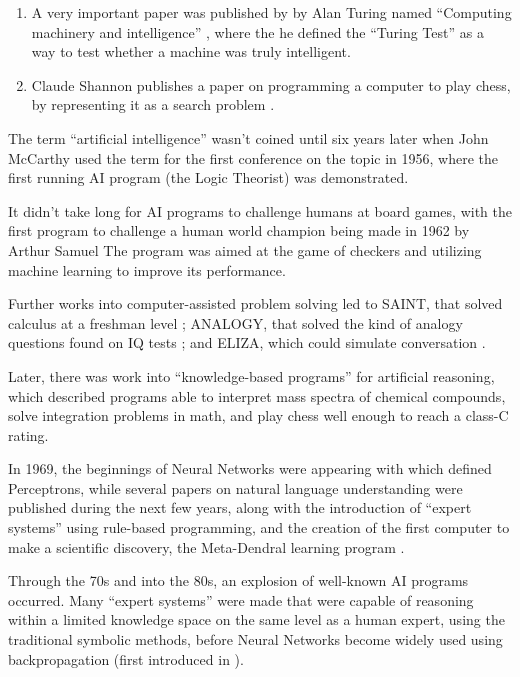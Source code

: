 \begin{enumerate}
\item A very important paper was published by by Alan Turing named ``Computing
  machinery and intelligence'' \citep{turing1950computing}, where the he defined
  the ``Turing Test'' as a way to test whether a machine was truly intelligent.
\item Claude Shannon publishes a paper on programming a computer to play chess,
  by representing it as a search problem \citep{shannon1950programming}.
\end{enumerate}

The term ``artificial intelligence'' wasn't coined until six years later when
John McCarthy used the term for the first conference on the topic in 1956, where
the first running AI program (the Logic Theorist) was demonstrated.

It didn't take long for AI programs to challenge humans at board games, with the
first program to challenge a human world champion being made in 1962 by Arthur
Samuel The program was aimed at the game of checkers and utilizing machine
learning to improve its performance.

Further works into computer-assisted problem solving led to SAINT, that solved
calculus at a freshman level \citep{slagle1963heuristic}; ANALOGY, that solved
the kind of analogy questions found on IQ tests \citet{evans1964program}; and
ELIZA, which could simulate conversation \citep{weizenbaum1966eliza}.

Later, there was work into ``knowledge-based programs'' for artificial
reasoning, which described programs able to interpret mass spectra of chemical
compounds, solve integration problems in math, and play chess well enough to
reach a class-C rating.

In 1969, the beginnings of Neural Networks were appearing with
\citet{minsky1969perceptrons} which defined Perceptrons, while several papers on
natural language understanding were published during the next few years, along
with the introduction of ``expert systems'' using rule-based programming, and
the creation of the first computer to make a scientific discovery, the
Meta-Dendral learning program \citep{buchanan1976applications}.

Through the 70s and into the 80s, an explosion of well-known AI programs
occurred. Many ``expert systems'' were made that were capable of reasoning
within a limited knowledge space on the same level as a human expert, using the
traditional symbolic methods, before Neural Networks become widely used using
backpropagation (first introduced in \citet{werbos1974beyond}).

